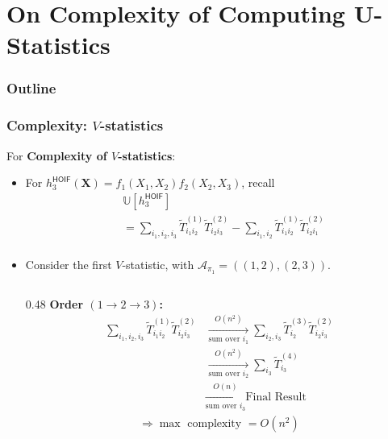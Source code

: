 \documentclass[9pt]{beamer}
\def\tilde{\widetilde}
\def\calA{\mathcal{A}}
\theoremstyle{mystyle}
\theoremstyle{mystyletwo}
\def\tilde{\widetilde}
\def\[{\left[}
\def\[{\left[}
\begin{document}
\section{On Complexity of Computing  U-Statistics}
\begin{frame}
    \frametitle{Outline}
    \tableofcontents[currentsection, sectionstyle=show/shaded, subsectionstyle=show/shaded/shaded]
\end{frame}




\begin{frame}
\frametitle{ Complexity: $V$-statistics}
    For {\bf  Complexity of  $V$-statistics}:
    \begin{itemize}
        \item For $h^{\mathsf{HOIF}}_3(\bm{X}) = f_1(X_1,X_2) f_2(X_2,X_3)$, recall
        \begin{align*}
            & \mathbb{U}[h^{\mathsf{HOIF}}_3] \\
    & = \sum_{i_1,i_2,i_3} \tilde{T}^{(1)}_{i_1i_2} \tilde{T}^{(2)}_{i_2i_3}  - \sum_{i_1, i_2 } \tilde{T}^{(1)}_{i_1i_2} \tilde{T}^{(2)}_{i_2i_1} \\
        \end{align*}
    \item Consider the first $V$-statistic, with  $\calA_{\pi_1} = ((1,2),(2,3)).$
\begin{columns}[t] 

    \begin{column}{0.48\textwidth}
    \textbf{Order $(1 \to 2 \to 3)$:}
    \begin{align*}
    \sum_{i_1,i_2,i_3} \tilde{T}^{(1)}_{i_1i_2}\tilde{T}^{(2)}_{i_2i_3}
    &\xrightarrow[\text{sum over } i_1]{O(n^2)} 
       \sum_{i_2,i_3} \tilde{T}^{(3)}_{i_2}\tilde{T}^{(2)}_{i_2i_3} \\[0.5em]
    &\xrightarrow[\text{sum over } i_2]{O(n^2)} 
       \sum_{i_3} \tilde{T}^{(4)}_{i_3} \\[0.5em]
    &\xrightarrow[\text{sum over } i_3]{O(n)} 
       \text{Final Result}
    \end{align*}
    \begin{align*}
    \Rightarrow \max\text{ complexity } = O(n^2)
     \end{align*}
    \end{column}



\end{columns}
\end{itemize}
\end{frame}
\end{document}
